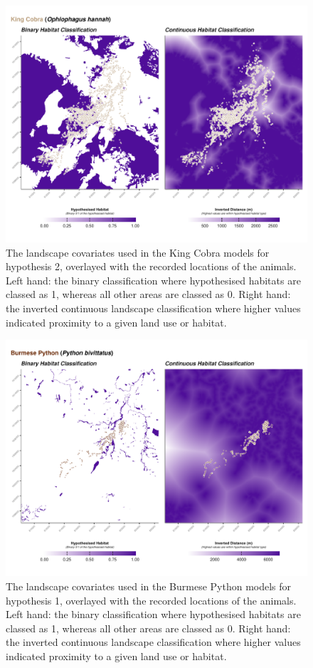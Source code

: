 \documentclass[10pt,a4paper]{article}
\begin{document}
\begin{figure}[h]
\includegraphics[width=1\linewidth]{../../figures/landscape_plot_OPHA_H2} \caption{The landscape covariates used in the King Cobra models for hypothesis 2, overlayed with the recorded locations of the animals. Left hand: the binary classification where hypothesised habitats are classed as 1, whereas all other areas are classed as 0. Right hand: the inverted continuous landscape classification where higher values indicated proximity to a given land use or habitat.}\label{fig:landscapePlotOPHA2}
\end{figure}

\begin{figure}[h]
\includegraphics[width=1\linewidth]{../../figures/landscape_plot_PYBI_H1} \caption{The landscape covariates used in the Burmese Python models for hypothesis 1, overlayed with the recorded locations of the animals. Left hand: the binary classification where hypothesised habitats are classed as 1, whereas all other areas are classed as 0. Right hand: the inverted continuous landscape classification where higher values indicated proximity to a given land use or habitat.}\label{fig:landscapePlotPYBI1}
\end{figure}
\end{document}
